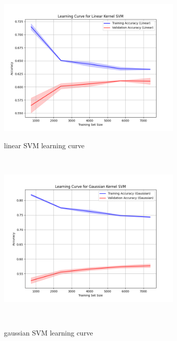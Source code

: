 \documentclass[10pt,a4paper]{article}
\begin{document}
\begin{figure}[h]
  \centering
  \begin{minipage}{0.2\textwidth}
      \centering
      \includegraphics[width=0.8\textwidth]{images/learning_curve_linear_SVM.png}
      \caption[width=0.8\linewidth]{linear SVM learning curve}
      \label{fig:linear_SVM_curve}
  \end{minipage}%
  \begin{minipage}{0.05\textwidth}
      \ 
  \end{minipage}
  \begin{minipage}{0.2\textwidth}
      \centering
      \includegraphics[width=0.8\textwidth]{images/learning_curve_gaussian_SVM.png}
      \caption[width=0.8\linewidth]{gaussian SVM learning curve}
      \label{fig:gaussian_SVM_curve}
  \end{minipage}%
  \begin{minipage}{0.05\textwidth}
      \ 
  \end{minipage}%
  \begin{minipage}{0.2\textwidth}

\end{minipage}
\end{figure}
\end{document}
